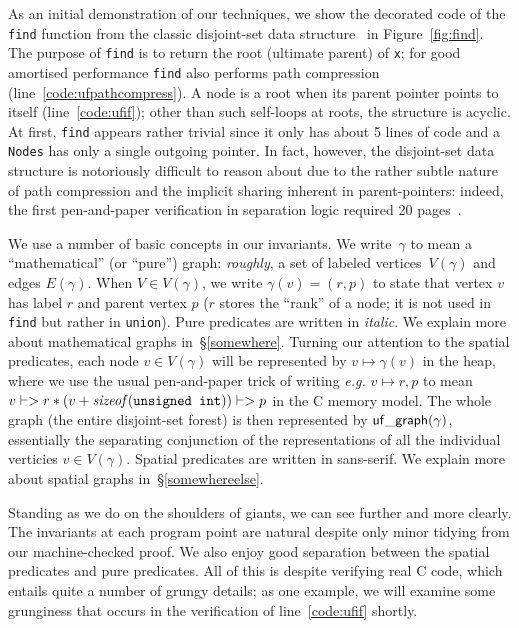 

As an initial demonstration of our techniques, we show the decorated code of the \texttt{find} function from the classic disjoint-set data structure~\cite{CLRS} in Figure~\ref{fig:find}.  The purpose of \texttt{find} is to return the root (ultimate parent) of \texttt{x}; for good amortised performance \texttt{find} also performs path compression (line~\ref{code:ufpathcompress}).  A node is a root when its parent pointer points to itself (line~\ref{code:ufif}); other than such self-loops at roots, the structure is acyclic.  At first, \texttt{find} appears rather trivial since it only has about 5 lines of code and a \texttt{Nodes} has only a single outgoing pointer.  In fact, however, the disjoint-set data structure is notoriously difficult to reason about due to the rather subtle nature of path compression and the implicit sharing inherent in parent-pointers: indeed, the first pen-and-paper verification in separation logic required 20 pages~\cite{neelthesis}.

We use a number of basic concepts in our invariants.  We write~$\gamma$ to mean a ``mathematical'' (or ``pure'') graph: \emph{roughly}, a set of labeled vertices~$V(\gamma)$ and edges $E(\gamma)$.  When $V \in V(\gamma)$, we write $\gamma(v) = (r,p)$ to state that vertex $v$ has label $r$ and parent vertex $p$ ($r$ stores the ``rank'' of a node; it is not used in \texttt{find} but rather in \texttt{union}).  Pure predicates are written in \textit{italic}.  We explain more about mathematical graphs in~\S\ref{somewhere}. Turning our attention to the spatial predicates, each node $v \in V(\gamma)$ will be represented by $v \mapsto \gamma(v)$ in the heap, where we use the usual pen-and-paper trick of writing \emph{e.g.} $v \mapsto r,p$ to mean \mbox{$v |-> r * (v + \mathit{sizeof}(\texttt{unsigned int})) |-> p$} in the C memory model.  The whole graph (the entire disjoint-set forest) is then represented by $\mathsf{uf\_graph}(\gamma)$, essentially the separating conjunction of the representations of all the individual verticies $v \in V(\gamma)$.  Spatial predicates are written in \textsf{sans-serif}.  We explain more about spatial graphs in~\S\ref{somewhereelse}.

Standing as we do on the shoulders of giants, we can see further and more clearly.  The invariants at each program point are natural despite only minor tidying from our machine-checked proof.  We also enjoy good separation between the spatial predicates and pure predicates.  All of this is despite verifying real C code, which entails quite a number of grungy details; as one example, we will examine some grunginess that occurs in the verification of line~\ref{code:ufif} shortly.

